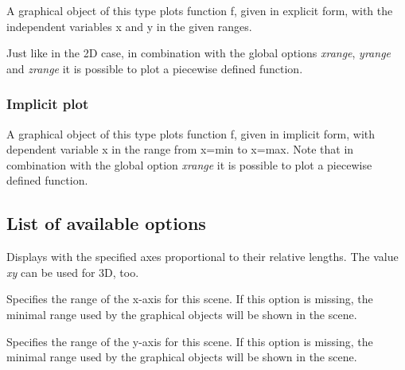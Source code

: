 \documentclass[../Maxima_Workbook.tex]{subfiles}
\begin{document}
\lz A graphical object of this type plots function f, given in explicit form, with the independent variables x and y in the given ranges. 

\lz Just like in the 2D case, in combination with the global options \emph{xrange}, \emph{yrange} and \emph{zrange} it is possible to plot a piecewise defined function.

\subsubsection{Implicit plot}

\lz {}\hfill {}

\lz A graphical object of this type plots function f, given in implicit form, with dependent variable x in the range from x=min to x=max. Note that in combination with the global option \emph{xrange} it is possible to plot a piecewise defined function.

\subsection{List of available options}

\lz {} \qquad {} \hfill {}

\lz Displays with the specified axes proportional to their relative lengths. The value \emph{xy} can be used for 3D, too.

\lzz {} \qquad {} \hfill {}

\lz Specifies the range of the x-axis for this scene. If this option is missing, the minimal range used by the graphical objects will be shown in the scene.

\lzz {} \qquad {} \hfill {}

\lz Specifies the range of the y-axis for this scene. If this option is missing, the minimal range used by the graphical objects will be shown in the scene. 
\end{document}
